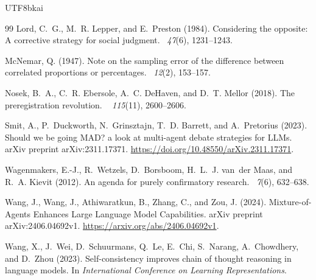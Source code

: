 \documentclass[12pt,a4paper]{article}
\begin{document}
\begin{CJK}{UTF8}{bkai}
\begin{thebibliography}{99}
Lord, C.~G., M.~R. Lepper, and E.~Preston (1984).
\newblock Considering the opposite: A corrective strategy for social judgment.
~{\em 47\/}(6),
  1231--1243.

McNemar, Q. (1947).
\newblock Note on the sampling error of the difference between correlated
  proportions or percentages.
~{\em 12\/}(2), 153--157.

Nosek, B.~A., C.~R. Ebersole, A.~C. DeHaven, and D.~T. Mellor (2018).
\newblock The preregistration revolution.
~{\em
  115\/}(11), 2600--2606.

Smit, A., P.~Duckworth, N.~Grinsztajn, T.~D. Barrett, and A.~Pretorius (2023).
\newblock Should we be going {MAD}? a look at multi-agent debate strategies for
  {LLMs}.
\newblock arXiv preprint arXiv:2311.17371.
\newblock \url{https://doi.org/10.48550/arXiv.2311.17371}.

Wagenmakers, E.-J., R.~Wetzels, D.~Borsboom, H.~L.~J. van~der Maas, and R.~A.
  Kievit (2012).
\newblock An agenda for purely confirmatory research.
~{\em 7\/}(6), 632--638.

Wang, J., Wang, J., Athiwaratkun, B., Zhang, C., and Zou, J. (2024).
\newblock Mixture-of-Agents Enhances Large Language Model Capabilities.
\newblock arXiv preprint arXiv:2406.04692v1.
\newblock \url{https://arxiv.org/abs/2406.04692v1}.

Wang, X., J.~Wei, D.~Schuurmans, Q.~Le, E.~Chi, S.~Narang, A.~Chowdhery, and
  D.~Zhou (2023).
\newblock Self-consistency improves chain of thought reasoning in language
  models.
\newblock In {\em International Conference on Learning Representations}.


\end{thebibliography}
\end{CJK}
\end{document}
